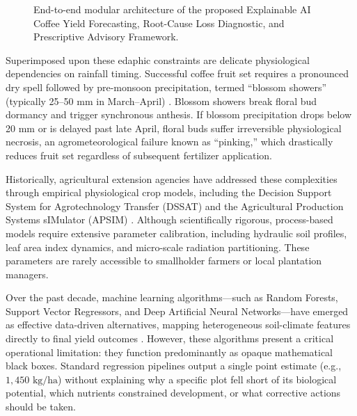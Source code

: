 \documentclass[conference]{IEEEtran}
\begin{document}
\begin{figure}[!t]
\caption{End-to-end modular architecture of the proposed Explainable AI Coffee Yield Forecasting, Root-Cause Loss Diagnostic, and Prescriptive Advisory Framework.}
\label{fig:architecture}
\end{figure}

Superimposed upon these edaphic constraints are delicate physiological dependencies on rainfall timing. Successful coffee fruit set requires a pronounced dry spell followed by pre-monsoon precipitation, termed ``blossom showers'' (typically 25--50 mm in March--April) \cite{coffeeboard2022}. Blossom showers break floral bud dormancy and trigger synchronous anthesis. If blossom precipitation drops below 20 mm or is delayed past late April, floral buds suffer irreversible physiological necrosis, an agrometeorological failure known as ``pinking,'' which drastically reduces fruit set regardless of subsequent fertilizer application.

Historically, agricultural extension agencies have addressed these complexities through empirical physiological crop models, including the Decision Support System for Agrotechnology Transfer (DSSAT) and the Agricultural Production Systems sIMulator (APSIM) \cite{boote1996}. Although scientifically rigorous, process-based models require extensive parameter calibration, including hydraulic soil profiles, leaf area index dynamics, and micro-scale radiation partitioning. These parameters are rarely accessible to smallholder farmers or local plantation managers. 

Over the past decade, machine learning algorithms—such as Random Forests, Support Vector Regressors, and Deep Artificial Neural Networks—have emerged as effective data-driven alternatives, mapping heterogeneous soil-climate features directly to final yield outcomes \cite{everingham2021, nguyen2022}. However, these algorithms present a critical operational limitation: they function predominantly as opaque mathematical black boxes. Standard regression pipelines output a single point estimate (e.g., $1,450\text{ kg/ha}$) without explaining why a specific plot fell short of its biological potential, which nutrients constrained development, or what corrective actions should be taken.
\end{document}
